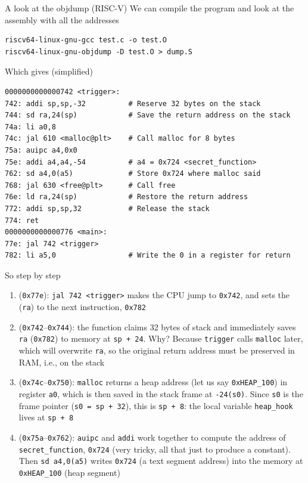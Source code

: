 \begin{parag}{A look at the objdump (RISC-V)}
    We can compile the program and look at the assembly with all the addresses
    \begin{lstlisting}
riscv64-linux-gnu-gcc test.c -o test.O
riscv64-linux-gnu-objdump -D test.O > dump.S
    \end{lstlisting}
    Which gives (simplified)
    \begin{lstlisting}
0000000000000742 <trigger>:
742: addi sp,sp,-32          # Reserve 32 bytes on the stack
744: sd ra,24(sp)            # Save the return address on the stack
74a: li a0,8
74c: jal 610 <malloc@plt>    # Call malloc for 8 bytes
75a: auipc a4,0x0
75e: addi a4,a4,-54          # a4 = 0x724 <secret_function>
762: sd a4,0(a5)             # Store 0x724 where malloc said
768: jal 630 <free@plt>      # Call free
76e: ld ra,24(sp)            # Restore the return address
772: addi sp,sp,32           # Release the stack
774: ret
0000000000000776 <main>:
77e: jal 742 <trigger>
782: li a5,0                 # Write the 0 in a register for return
    \end{lstlisting}
    So step by step
    \begin{enumerate}
        \item {} (\texttt{0x77e}): \texttt{jal 742 <trigger>} makes the CPU jump to \texttt{0x742}, and sets the  (\texttt{ra}) to the next instruction, \texttt{0x782}
        \item {} (\texttt{0x742}--\texttt{0x744}): the function claims 32 bytes of stack and immediately saves \texttt{ra} (\texttt{0x782}) to memory at \texttt{sp + 24}. Why? Because \texttt{trigger} calls \texttt{malloc} later, which will overwrite \texttt{ra}, so the original return address must be preserved in RAM, i.e., on the stack
        \item {} (\texttt{0x74c}--\texttt{0x750}): \texttt{malloc} returns a heap address (let us say \texttt{0xHEAP\_100}) in register \texttt{a0}, which is then saved in the stack frame at \texttt{-24(s0)}. Since \texttt{s0} is the frame pointer (\texttt{s0 = sp + 32}), this is \texttt{sp + 8}: the local variable \texttt{heap\_hook} lives at \texttt{sp + 8}
        \item {} (\texttt{0x75a}--\texttt{0x762}): \texttt{auipc} and \texttt{addi} work together to compute the address of \texttt{secret\_function}, \texttt{0x724} (very tricky, all that just to produce a constant). Then \texttt{sd a4,0(a5)} writes \texttt{0x724} (a text segment address) into the memory at \texttt{0xHEAP\_100} (heap segment)

\end{enumerate}
\end{parag}
